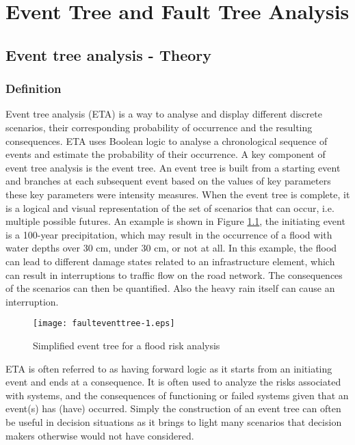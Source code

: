 %
%
%
\chapter{Event Tree and Fault Tree Analysis}
\label{faulteventreechapter} %
\section{Event tree analysis - Theory}
\subsection{Definition}
Event tree analysis (ETA) is a way to analyse and display different discrete
scenarios, their corresponding probability of occurrence and the resulting
consequences. ETA uses Boolean logic to analyse a chronological sequence of
events and estimate the probability of their occurrence. A key component of event
tree analysis is the event tree. An event tree is built from a starting event and
branches at each subsequent event based on the values of key parameters these key
parameters were intensity measures. When the event tree is complete, it is a
logical and visual representation of the set of scenarios that can occur, i.e.
multiple possible futures. An example is shown in Figure \ref{figeventfault:1}, the
initiating event is a 100-year precipitation, which may result in the occurrence
of a flood with water depths over 30 cm, under 30 cm, or not at all. In this
example, the flood can lead to different damage states related to an
infrastructure element, which can result in interruptions to traffic flow on the
road network. The consequences of the scenarios can then be quantified. Also the
heavy rain itself can cause an interruption.
\begin{figure}[h]
\texttt{[image: faulteventtree-1.eps]}
\caption{Simplified event tree for a flood risk analysis}\label{figeventfault:1}
\end{figure}
ETA is often referred to as having forward logic as it starts from an initiating
event and ends at a consequence. It is often used to analyze the risks associated
with systems, and the consequences of functioning or failed systems given that an
event(s) has (have) occurred. Simply the construction of an event tree can often
be useful in decision situations as it brings to light many scenarios that
decision makers otherwise would not have considered.

